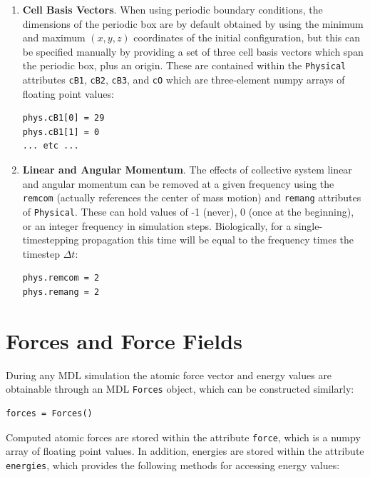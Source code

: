 \documentclass[11pt]{report}
\begin{document}
\begin{enumerate}
\item {\bf Cell Basis Vectors}.
When using periodic boundary conditions, the dimensions of 
the periodic box are by default obtained by using the minimum
and maximum \begin{math}(x, y, z)\end{math} coordinates of 
the initial configuration, but this can be specified manually
by providing a set of three cell basis vectors which span the periodic
box, plus an origin.  These are contained within the \texttt{Physical}
attributes \texttt{cB1}, \texttt{cB2}, \texttt{cB3}, and \texttt{cO}
which are three-element numpy arrays of floating point values:

\begin{verbatim}
phys.cB1[0] = 29
phys.cB1[1] = 0
... etc ...
\end{verbatim}

\item {\bf Linear and Angular Momentum}.
The effects of collective system linear and angular momentum
can be removed at a given frequency using the \texttt{remcom}
(actually references the center of mass motion)
and \texttt{remang} attributes of \texttt{Physical}.  These can
hold values of -1 (never), 0 (once at the beginning), or 
an integer frequency in simulation steps.  Biologically, for
a single-timestepping propagation this time will be equal to
the frequency times the timestep \begin{math} \Delta t \end{math}:

\begin{verbatim}
phys.remcom = 2
phys.remang = 2
\end{verbatim}

\end{enumerate}

\section{Forces and Force Fields}

During any MDL simulation the atomic force vector
and energy values are obtainable through an MDL
\texttt{Forces} object, which can be constructed
similarly:

\begin{verbatim}
forces = Forces()
\end{verbatim}

Computed atomic forces are stored within the attribute
\texttt{force}, which is a numpy array of floating point values.
In addition, energies are stored within the attribute
\texttt{energies}, which provides the following methods
for accessing energy values: \\
\end{document}
